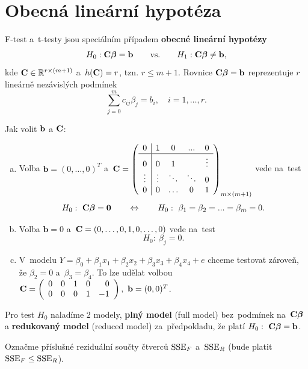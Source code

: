 \section{Obecná lineární hypotéza}
F-test a~t-testy jsou speciálním případem \textbf{obecné lineární hypotézy}
 $$ H_0: \textbf{C}\boldsymbol{\beta} = \textbf{b} \qquad\text{vs.}\qquad H_1: \textbf{C}\boldsymbol{\beta}\neq\textbf{b}, $$
kde $\textbf{C}\in\mathbb{R}^{r\times(m+1)}$ a~$h(\textbf{C}) = r$, tzn. $r\leq m+1$. Rovnice $\textbf{C}\boldsymbol{\beta} = \textbf{b}$ reprezentuje $r$ lineárně nezávislých podmínek
 $$ \sum_{j = 0}^m c_{ij}\beta_j = b_i,\quad i = 1,\dots,r. $$
\begin{remark}
	Jak volit $\mathbf{b}$ a $\textbf{C}$:
	
	\begin{enumerate}[a)]
		\item Volba $\textbf{b} = (0,\dots,0)^T$ a~$ \textbf{C} = \left(\begin{array}{c|cccc}
		0 & 1 & 0 &... & 0 \\\hline
		0 & 0 & 1 &  & \vdots \\
		\vdots& \vdots & \ddots & \ddots & 0 \\
		0 & 0 & \dots & 0 & 1
		\end{array}
		\right)_{m\times(m+1)} $ vede na~test
		 $$ H_0:~\textbf{C}\boldsymbol{\beta} = \boldsymbol{0}\qquad\Leftrightarrow\qquad H_0:~\beta_1 = \beta_2 = ... = \beta_m = 0. $$
		\item Volba $\textbf{b} = 0$ a~$\textbf{C} = (0,\dots,0,1,0,\dots,0)$ vede na~test
		 $$ H_0:~\beta_j = 0. $$
		\item V~modelu $Y = \beta_0+\beta_1x_1+\beta_2x_2+\beta_3x_3+\beta_4x_4+e$ chceme testovat zároveň, že $\beta_2 = 0$ a~$\beta_3 = \beta_4$. To lze udělat volbou $ \textbf{C} = \left(\begin{array}{rrrrr}
		0 & 0 & 1 & 0 & 0 \\
		0 & 0 & 0 & 1 & -1
		\end{array}
		 \right),~\textbf{b} = (0,0)^T $.
	\end{enumerate}
\end{remark}

Pro test $H_0$ naladíme 2 modely, \textbf{plný model} (full model) bez~podmínek na~$\textbf{C}\boldsymbol{\beta}$ a \textbf{redukovaný model} (reduced model) za~předpokladu, že platí $H_0:~\textbf{C}\boldsymbol{\beta} = \mathbf{b}$.

Označme příslušné reziduální součty čtverců $\mathrm{SSE}_F$ a~$\mathrm{SSE}_R$ (bude platit $\mathrm{SSE}_F\leq\mathrm{SSE}_R$).

